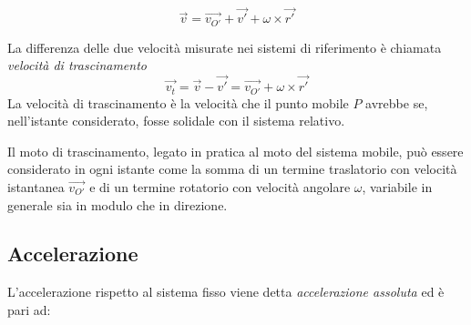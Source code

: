 \documentclass[class=book, crop=false, oneside, 12pt]{standalone}
\begin{document}
\begin{equation}
    \overrightarrow{v} = \overrightarrow{v_{O'}} + \overrightarrow{v'} + \omega \times \overrightarrow{r'}
\end{equation}

La differenza delle due velocità misurate nei sistemi di riferimento è chiamata \emph{velocità di trascinamento}
\begin{equation*}
    \overrightarrow{v_t} = \overrightarrow{v} - \overrightarrow{v'} = \overrightarrow{v_{O'}} + \omega \times \overrightarrow{r'}
\end{equation*}
La velocità di trascinamento è la velocità che il punto mobile \(P\) avrebbe se, nell’istante considerato, fosse solidale con il sistema relativo.

Il moto di trascinamento, legato in pratica al moto del sistema mobile, può essere considerato in ogni istante come la somma di un termine traslatorio con velocità istantanea \(\overrightarrow{v_{O'}}\) e di un termine rotatorio con velocità angolare \(\omega\), variabile in generale sia in modulo che in direzione.

\subsection{Accelerazione}

L'accelerazione rispetto al sistema fisso viene detta \emph{accelerazione assoluta} ed è pari ad:
\end{document}
